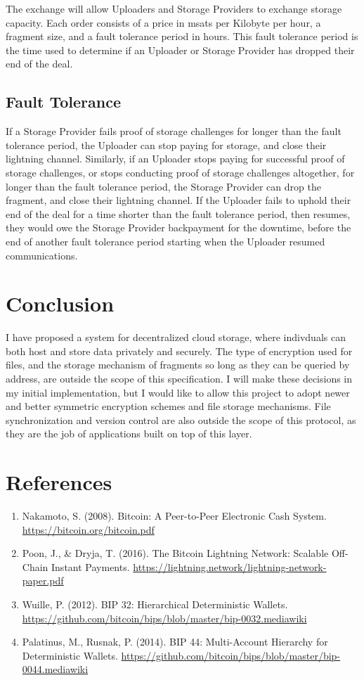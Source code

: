 \documentclass[12pt]{article}
\begin{document}
The exchange will allow Uploaders and Storage Providers to exchange storage capacity. Each order consists of a price in msats per Kilobyte per hour, a fragment size, and a fault tolerance period in hours. This fault tolerance period is the time used to determine if an Uploader or Storage Provider has dropped their end of the deal.

\subsection{Fault Tolerance}
If a Storage Provider fails proof of storage challenges for longer than the fault tolerance period, the Uploader can stop paying for storage, and close their lightning channel. Similarly, if an Uploader stops paying for successful proof of storage challenges, or stops conducting proof of storage challenges altogether, for longer than the fault tolerance period, the Storage Provider can drop the fragment, and close their lightning channel. If the Uploader fails to uphold their end of the deal for a time shorter than the fault tolerance period, then resumes, they would owe the Storage Provider backpayment for the downtime, before the end of another fault tolerance period starting when the Uploader resumed communications.

\section{Conclusion}
I have proposed a system for decentralized cloud storage, where indivduals can both host and store data privately and securely. The type of encryption used for files, and the storage mechanism of fragments so long as they can be queried by address, are outside the scope of this specification. I will make these decisions in my initial implementation, but I would like to allow this project to adopt newer and better symmetric encryption schemes and file storage mechanisms. File synchronization and version control are also outside the scope of this protocol, as they are the job of applications built on top of this layer.

\section{References}

\begin{enumerate}
\item Nakamoto, S. (2008). Bitcoin: A Peer-to-Peer Electronic Cash System. \url{https://bitcoin.org/bitcoin.pdf}
\item Poon, J., \& Dryja, T. (2016). The Bitcoin Lightning Network: Scalable Off-Chain Instant Payments. \url{https://lightning.network/lightning-network-paper.pdf}
\item Wuille, P. (2012). BIP 32: Hierarchical Deterministic Wallets. \url{https://github.com/bitcoin/bips/blob/master/bip-0032.mediawiki}
\item Palatinus, M., Rusnak, P. (2014). BIP 44: Multi-Account Hierarchy for Deterministic Wallets. \url{https://github.com/bitcoin/bips/blob/master/bip-0044.mediawiki}
\end{enumerate}
\end{document}
